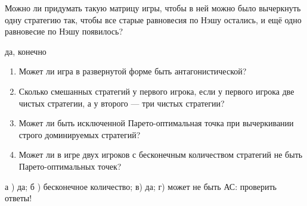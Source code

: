 \begin{problem}
 Можно ли придумать такую матрицу игры, чтобы в ней можно было вычеркнуть одну стратегию так, чтобы все старые равновесия по Нэшу остались, и ещё одно равновесие по Нэшу появилось?

\begin{sol}
 да, конечно
\end{sol}
\end{problem}

\begin{problem}

\begin{enumerate}
\item Может ли игра в развернутой форме быть антагонистической?\par
\item Сколько смешанных стратегий у первого игрока, если у первого игрока две чистых стратегии, а у второго — три чистых стратегии?\par
\item  Может ли быть исключенной Парето-оптимальная точка при вычеркивании строго доминируемых стратегий?\par
\item Может ли в игре двух игроков с бесконечным количеством стратегий не быть Парето-оптимальных точек?
\end{enumerate}


\begin{sol}
а ) да; б ) бесконечное количество; в) да; г) может не быть
{\red АС: проверить ответы!}
\end{sol}
\end{problem}





